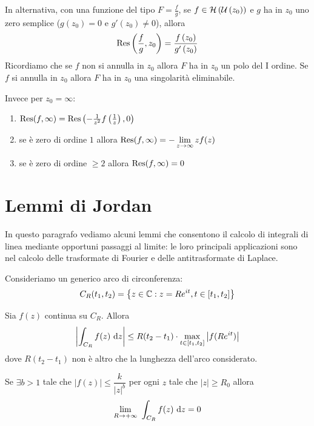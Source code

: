 In alternativa, con una funzione del tipo $F = \frac{f}{g}$, se $f\in \mathcal{H} \left(\mathcal{U} \left(z_{0}\right)\right)$ e $g$ ha in $z_{0}$ uno zero semplice ($g\left(z_{0}\right) = 0$ e $g'\left(z_{0}\right) \neq 0$), allora
\begin{equation*}
\operatorname{Res} \left(\frac{f}{g}, z_{0}\right) = \frac{f\left(z_{0}\right)}{g'\left(z_{0}\right)}
\end{equation*}
Ricordiamo che se $f$ non si annulla in $z_{0}$ allora $F$ ha in $z_{0}$ un polo del I ordine. Se $f$ si annulla in $z_{0}$ allora $F$ ha in $z_{0}$ una singolarità eliminabile.

Invece per $z_{0} = \infty $:
\begin{enumerate}
\item $\operatorname{Res} (f, \infty) = \operatorname{Res} \left(- \frac{1}{z^{2}} f\left(\frac{1}{z}\right), 0\right)$
\item se è zero di ordine $1$ allora $\operatorname{Res} (f, \infty) = - \lim\limits_{z\rightarrow \infty} zf(z)$
\item se è zero di ordine $ \geq 2$ allora $\operatorname{Res} (f, \infty) = 0$
\end{enumerate}


\section{Lemmi di Jordan}

In questo paragrafo vediamo alcuni lemmi che consentono il calcolo di integrali di linea mediante opportuni passaggi al limite: le loro principali applicazioni sono nel calcolo delle trasformate di Fourier e delle antitrasformate di Laplace.

Consideriamo un generico arco di circonferenza:
\begin{equation*}
C_{R}(t_{1}, t_{2}) = \left\{z\in \mathbb{C} : z = Re^{it}, t \in [t_{1}, t_{2}]\right\}
\end{equation*}

\begin{lemma}
Sia $f(z)$ continua su $C_{R}$. Allora
\begin{equation*}
\left| \int_{C_{R}} f(z)\  \mathrm{d} z\right| \leq R(t_{2} - t_{1})\cdot \max_{t\in [t_1,t_2]}\left|f(Re^{it})  \right|
\end{equation*}
dove $R(t_{2} - t_{1})$ non è altro che la lunghezza dell'arco considerato.
\end{lemma}

\begin{coro}
Se $\exists b>1$ tale che $|f(z)| \leq \dfrac{k}{|z|^{b}}$ per ogni $z$ tale che $|z|\geq R_0$ allora
\begin{equation*}
\lim_{R\rightarrow +\infty}\ \int_{C_{R}} f(z)\dz = 0
\end{equation*}
\end{coro}

